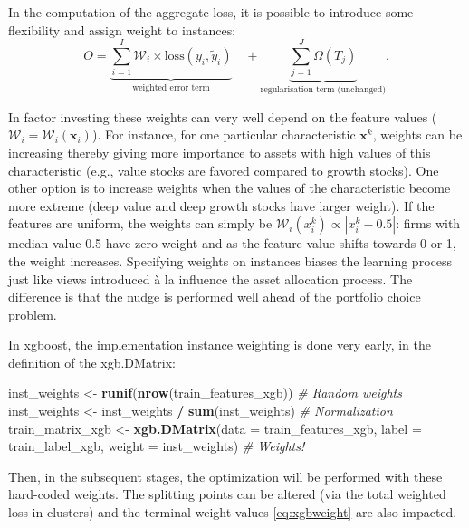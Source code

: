 \documentclass[]{krantz}
\makeatletter
\newenvironment{Shaded}{\begin{snugshade}}{\end{snugshade}}
\newcommand{\CommentTok}[1]{\textcolor[rgb]{0.37,0.37,0.37}{\textit{#1}}}
\newcommand{\DataTypeTok}[1]{\textcolor[rgb]{0.27,0.27,0.27}{#1}}
\newcommand{\KeywordTok}[1]{\textcolor[rgb]{0.27,0.27,0.27}{\textbf{#1}}}
\newcommand{\NormalTok}[1]{#1}
\newcommand{\OperatorTok}[1]{\textcolor[rgb]{0.43,0.43,0.43}{\textbf{#1}}}
\newcommand{\StringTok}[1]{\textcolor[rgb]{0.5,0.5,0.5}{#1}}
\newenvironment{kframe}{%
\medskip{}
\setlength{\fboxsep}{.8em}
 \def\at@end@of@kframe{}%
 \ifinner\ifhmode%
  \def\at@end@of@kframe{\end{minipage}}%
  \begin{minipage}{\columnwidth}%
 \fi\fi%
 \def\FrameCommand##1{\hskip\@totalleftmargin \hskip-\fboxsep
 \colorbox{shadecolor}{##1}\hskip-\fboxsep
     \hskip-\linewidth \hskip-\@totalleftmargin \hskip\columnwidth}%
 \MakeFramed {\advance\hsize-\width
   \@totalleftmargin\z@ \linewidth\hsize
   \@setminipage}}%
 {\par\unskip\endMakeFramed%
 \at@end@of@kframe}
\renewenvironment{Shaded}{\begin{kframe}}{\end{kframe}}
\theoremstyle{definition}
\theoremstyle{definition}
\theoremstyle{definition}
\theoremstyle{remark}
\makeatother
\begin{document}
In the computation of the aggregate loss, it is possible to introduce
some flexibility and assign weight to instances:
\[O=\underbrace{\sum_{i=1}^I\mathcal{W}_i \times \text{loss}(y_i,\tilde{y}_i)}_{\text{weighted error term}} \quad + \underbrace{\sum_{j=1}^J\Omega(T_j)}_{\text{regularisation term (unchanged)}}.\]

In factor investing these weights can very well depend on the feature
values (\(\mathcal{W}_i=\mathcal{W}_i(\textbf{x}_i)\)). For instance,
for one particular characteristic \(\textbf{x}^k\), weights can be
increasing thereby giving more importance to assets with high values of
this characteristic (e.g., value stocks are favored compared to growth
stocks). One other option is to increase weights when the values of the
characteristic become more extreme (deep value and deep growth stocks
have larger weight). If the features are uniform, the weights can simply
be \(\mathcal{W}_i(x_i^k)\propto|x_i^k-0.5|\): firms with median value
0.5 have zero weight and as the feature value shifts towards 0 or 1, the
weight increases. Specifying weights on instances biases the learning
process just like views introduced à la \citet{black1992global}
influence the asset allocation process. The difference is that the nudge
is performed well ahead of the portfolio choice problem.

In xgboost, the implementation instance weighting is done very early, in
the definition of the xgb.DMatrix:

\footnotesize

\begin{Shaded}
\begin{Highlighting}[]
\NormalTok{inst_weights <-}\StringTok{ }\KeywordTok{runif}\NormalTok{(}\KeywordTok{nrow}\NormalTok{(train_features_xgb))               }\CommentTok{# Random weights}
\NormalTok{inst_weights <-}\StringTok{ }\NormalTok{inst_weights }\OperatorTok{/}\StringTok{ }\KeywordTok{sum}\NormalTok{(inst_weights)              }\CommentTok{# Normalization}
\NormalTok{train_matrix_xgb <-}\StringTok{ }\KeywordTok{xgb.DMatrix}\NormalTok{(}\DataTypeTok{data =}\NormalTok{ train_features_xgb, }
                                \DataTypeTok{label =}\NormalTok{ train_label_xgb,}
                                \DataTypeTok{weight =}\NormalTok{ inst_weights)        }\CommentTok{# Weights!}
\end{Highlighting}
\end{Shaded}

\normalsize

Then, in the subsequent stages, the optimization will be performed with
these hard-coded weights. The splitting points can be altered (via the
total weighted loss in clusters) and the terminal weight values
\eqref{eq:xgbweight} are also impacted.
\end{document}
